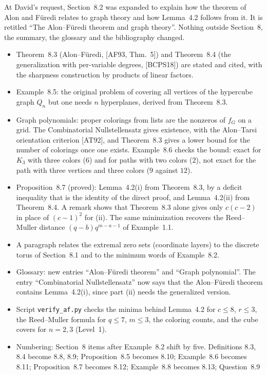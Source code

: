\documentclass[12pt,letterpaper]{article}
\begin{document}
At David's request, Section~8.2 was expanded to explain how the theorem of
Alon and F\"uredi relates to graph theory and how Lemma~4.2 follows from it.
It is retitled ``The Alon--F\"uredi theorem and graph theory''. Nothing
outside Section~8, the summary, the glossary and the bibliography changed.
\begin{itemize}[leftmargin=*]
\item Theorem~8.3 (Alon--F\"uredi, [AF93, Thm.~5]) and Theorem~8.4 (the
generalization with per-variable degrees, [BCPS18]) are stated and cited,
with the sharpness construction by products of linear factors.
\item Example~8.5: the original problem of covering all vertices of the
hypercube graph $Q_n$ but one needs $n$ hyperplanes, derived from
Theorem~8.3.
\item Graph polynomials: proper colorings from lists are the nonzeros of
$f_G$ on a grid. The Combinatorial Nullstellensatz gives existence, with the
Alon--Tarsi orientation criterion [AT92], and Theorem~8.3 gives a lower bound
for the number of colorings once one exists. Example~8.6 checks the bound:
exact for $K_3$ with three colors ($6$) and for paths with two colors ($2$),
not exact for the path with three vertices and three colors ($9$ against
$12$).
\item Proposition~8.7 (proved): Lemma~4.2(i) from Theorem~8.3, by a deficit
inequality that is the identity of the direct proof, and Lemma~4.2(ii) from
Theorem~8.4. A remark shows that Theorem~8.3 alone gives only $c(c-2)$ in
place of $(c-1)^2$ for (ii). The same minimization recovers the Reed--Muller
distance $(q-b)q^{m-a-1}$ of Example~1.1.
\item A paragraph relates the extremal zero sets (coordinate layers) to the
discrete torus of Section~8.1 and to the minimum words of Example~8.2.
\item Glossary: new entries ``Alon--F\"uredi theorem'' and ``Graph
polynomial''. The entry ``Combinatorial Nullstellensatz'' now says that the
Alon--F\"uredi theorem contains Lemma~4.2(i), since part (ii) needs the
generalized version.
\item Script \texttt{verify\_af.py} checks the minima behind Lemma~4.2 for
$c\le8$, $r\le3$, the Reed--Muller formula for $q\le7$, $m\le3$, the coloring
counts, and the cube covers for $n=2,3$ (Level~1).
\item Numbering: Section~8 items after Example~8.2 shift by five. Definitions
8.3, 8.4 become 8.8, 8.9; Proposition~8.5 becomes 8.10; Example~8.6 becomes
8.11; Proposition~8.7 becomes 8.12; Example~8.8 becomes 8.13; Question~8.9

\end{itemize}
\end{document}
